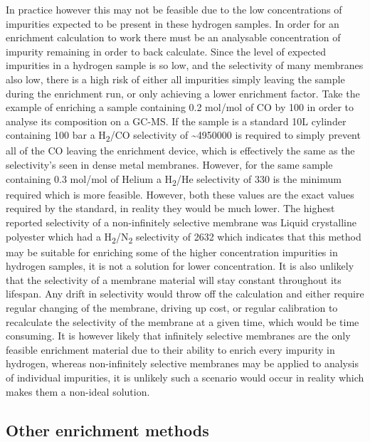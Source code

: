 In practice however this may not be feasible due to the low concentrations of impurities expected to be 
present in these hydrogen samples. In order for an enrichment calculation to work there must be an analysable 
concentration of impurity remaining in order to back calculate. Since the level of expected impurities in a 
hydrogen sample is so low, and the selectivity of many membranes also low, there is a high risk of either all 
impurities simply leaving the sample during the enrichment run, or only achieving a lower enrichment factor. 
Take the example of enriching a sample containing 0.2 \textmu mol/mol of CO by 100 in order to analyse its 
composition on 
a GC-MS. If the sample is a standard 10L cylinder containing 100 bar a H\textsubscript{2}/CO selectivity of 
\textasciitilde 4950000 is required to simply prevent all of the CO leaving the enrichment device, which is 
effectively the 
same as the selectivity’s seen in dense metal membranes. However, for the same sample containing 0.3 \textmu mol/mol 
of 
Helium a H\textsubscript{2}/He selectivity of 330 is the minimum required which is more feasible. However, both these values 
are the exact values required by the standard, in reality they would be much lower. The highest reported 
selectivity of a non-infinitely selective membrane was Liquid crystalline polyester which had a 
H\textsubscript{2}/N\textsubscript{2} 
selectivity of  2632 \cite{Weinkauf1992} which indicates that this method may be suitable for enriching some of the higher 
concentration impurities in hydrogen samples, it is not a solution for lower concentration. 
It is also unlikely that the selectivity of a membrane material will stay constant throughout its lifespan. 
Any drift in selectivity would throw off the calculation and either require regular changing of the membrane, 
driving up cost, or regular calibration to recalculate the selectivity of the membrane at a given time, which 
would be time consuming. It is however likely that infinitely selective membranes are the only feasible 
enrichment material due to their ability to enrich every impurity in hydrogen, whereas non-infinitely 
selective membranes may be applied to analysis of individual impurities, it is unlikely such a scenario 
would occur in reality which makes them a non-ideal solution. 

\subsection{Other enrichment methods}
